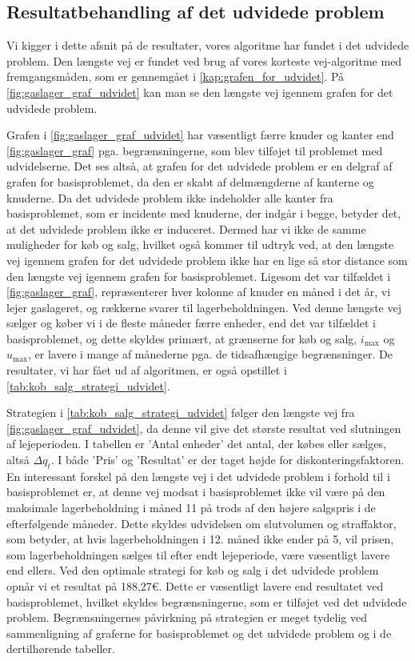 \subsection{Resultatbehandling af det udvidede problem} \label{kap:resultat_udvidet}

Vi kigger i dette afsnit på de resultater, vores algoritme har fundet i det udvidede problem. Den længste vej er fundet ved brug af vores korteste vej-algoritme med fremgangsmåden, som er gennemgået i \autoref{kap:grafen_for_udvidet}. På \autoref{fig:gaslager_graf_udvidet} kan man se den længste vej igennem grafen for det udvidede problem.

Grafen i \autoref{fig:gaslager_graf_udvidet} har væsentligt færre knuder og kanter end \autoref{fig:gaslager_graf} pga. begrænsningerne, som blev tilføjet til problemet med udvidelserne. Det ses altså, at grafen for det udvidede problem er en delgraf af grafen for basisproblemet, da den er skabt af delmængderne af kanterne og knuderne. 
Da det udvidede problem ikke indeholder alle kanter fra basisproblemet, som er incidente med knuderne, der indgår i begge, betyder det, at det udvidede problem ikke er induceret. Dermed har vi ikke de samme muligheder for køb og salg, hvilket også kommer til udtryk ved, at den længste vej igennem grafen for det udvidede problem ikke har en lige så stor distance som den længste vej igennem grafen for basisproblemet. Ligesom det var tilfældet i \autoref{fig:gaslager_graf}, repræsenterer hver kolonne af knuder en måned i det år, vi lejer gaslageret, og rækkerne svarer til lagerbeholdningen. Ved denne længste vej sælger og køber vi i de fleste måneder færre enheder, end det var tilfældet i basisproblemet, og dette skyldes primært, at grænserne for køb og salg, $i_{\max}$ og $u_{\max}$, er lavere i mange af månederne pga. de tidsafhængige begrænsninger. 
De resultater, vi har fået ud af algoritmen, er også opstillet i \autoref{tab:kob_salg_strategi_udvidet}. 

Strategien i \autoref{tab:kob_salg_strategi_udvidet} følger den længste vej fra \autoref{fig:gaslager_graf_udvidet}, da denne vil give det største resultat ved slutningen af lejeperioden. I tabellen er 'Antal enheder' det antal, der købes eller sælges, altså $\Delta q_t$. I både 'Pris' og 'Resultat' er der taget højde for diskonteringsfaktoren. En interessant forskel på den længste vej i det udvidede problem i forhold til i basisproblemet er, at denne vej modsat i basisproblemet ikke vil være på den maksimale lagerbeholdning i måned 11 på trods af den højere salgspris i de efterfølgende måneder. Dette skyldes udvidelsen om slutvolumen og straffaktor, som betyder, at hvis lagerbeholdningen i 12. måned ikke ender på 5, vil prisen, som lagerbeholdningen sælges til efter endt lejeperiode, være væsentligt lavere end ellers. 
Ved den optimale strategi for køb og salg i det udvidede problem opnår vi et resultat på 188,27€. Dette er væsentligt lavere end resultatet ved basisproblemet, hvilket skyldes begrænsningerne, som er tilføjet ved det udvidede problem. Begrænsningernes påvirkning på strategien er meget tydelig ved sammenligning af graferne for basisproblemet og det udvidede problem og i de dertilhørende tabeller. 